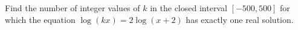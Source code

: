 Find the number of integer values of $k$ in the closed interval $[-500,500]$ for which the equation $\log(kx)=2\log(x+2)$ has exactly one real solution.